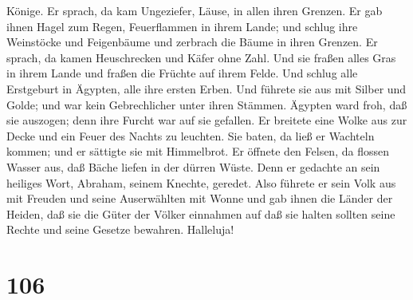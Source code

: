 Könige.  Er sprach, da kam Ungeziefer, Läuse, in allen
ihren Grenzen.  Er gab ihnen Hagel zum Regen, Feuerflammen
in ihrem Lande;  und schlug ihre Weinstöcke und Feigenbäume
und zerbrach die Bäume in ihren Grenzen.  Er sprach, da
kamen Heuschrecken und Käfer ohne Zahl.  Und sie fraßen
alles Gras in ihrem Lande und fraßen die Früchte auf ihrem Felde.
 Und schlug alle Erstgeburt in Ägypten, alle ihre ersten
Erben.  Und führete sie aus mit Silber und Golde; und war
kein Gebrechlicher unter ihren Stämmen.  Ägypten ward froh,
daß sie auszogen; denn ihre Furcht war auf sie gefallen. 
Er breitete eine Wolke aus zur Decke und ein Feuer des Nachts zu
leuchten.  Sie baten, da ließ er Wachteln kommen; und er
sättigte sie mit Himmelbrot.  Er öffnete den Felsen, da
flossen Wasser aus, daß Bäche liefen in der dürren Wüste. 
Denn er gedachte an sein heiliges Wort, Abraham, seinem Knechte,
geredet.  Also führete er sein Volk aus mit Freuden und
seine Auserwählten mit Wonne  und gab ihnen die Länder der
Heiden, daß sie die Güter der Völker einnahmen  auf daß sie
halten sollten seine Rechte und seine Gesetze bewahren. Halleluja!

\hypertarget{section-105}{%
\section{106}\label{section-105}}

